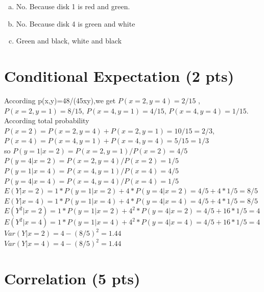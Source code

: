 \documentclass[11pt]{article}
\begin{document}
\begin{enumerate}[(a)]
  \item No. Because disk 1 is red and green.
  \item No. Because disk 4 is green and white
  \item Green and black, white and black
  \end{enumerate}

\section{Conditional Expectation (2 pts)}

According p(x,y)=48/(45xy),we get $P(x=2,y=4)=2/15$ ,$P(x=2,y=1)= 8/15$, $P(x = 4,y =1) = 4/15$, $P(x=4,y=4) = 1/15$.\\
According total probability  $P(x=2)= P(x=2,y=4) + P(x=2,y=1) = 10/15 = 2/3$, $P(x=4) = P(x = 4,y =1) + P(x=4,y=4) = 5/15=1/3$ \\
so $P(y = 1|x=2) = P(x=2,y=1) / P(x=2) = 4/5$ \\
$P(y = 4|x=2) = P(x=2,y=4) / P(x=2) = 1/5$\\
$P(y = 1|x=4) = P(x=4,y=1) / P(x=4) = 4/5$\\
$P(y = 4|x=4) = P(x=4,y=4) / P(x=4) = 1/5$\\
$E(Y|x=2) = 1 * P(y= 1|x=2) +  4*P(y=4|x=2) = 4/5 + 4*1/5 = 8/5$\\
$E(Y|x=4) = 1 * P(y= 1|x=4) +  4*P(y=4|x=4) = 4/5 + 4*1/5 = 8/5$\\
$E(Y^2|x=2) = 1 * P(y= 1|x=2) +  4^2*P(y=4|x=2) = 4/5 + 16*1/5 = 4$\\
$E(Y^2|x=4) = 1 * P(y= 1|x=4) +  4^2*P(y=4|x=4) = 4/5 + 16*1/5 = 4$\\
$Var(Y|x=2) = 4 - (8/5)^2 = 1.44$\\
$Var(Y|x=4) = 4 - (8/5)^2 = 1.44$

\section{Correlation (5 pts)}
\end{document}

